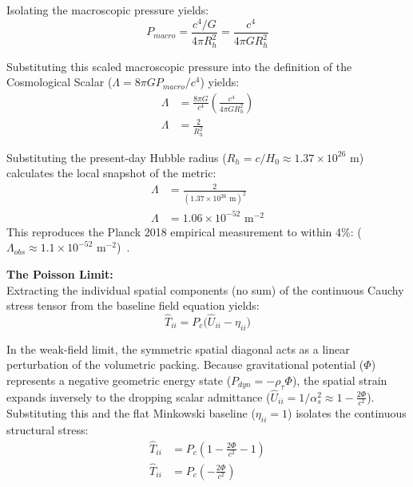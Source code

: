 Isolating the macroscopic pressure yields:
\begin{equation}
    P_{macro} = \frac{c^4/G}{4\pi R_h^2} = \frac{c^4}{4\pi G R_h^2} 
\end{equation}

Substituting this scaled macroscopic pressure into the definition of the Cosmological Scalar ($\Lambda = 8\pi G P_{macro} / c^4$) yields: 
\begin{align}
    \Lambda &= \frac{8\pi G}{c^4} \left( \frac{c^4}{4\pi G R_h^2} \right) \nonumber \\
    \Lambda &= \frac{2}{R_h^2} \label{eq:tensor_cosmological_constant}
\end{align}

Substituting the present-day Hubble radius ($R_h = c / H_0 \approx 1.37 \times 10^{26} \text{ m}$) calculates the local snapshot of the metric: 
\begin{align}
    \Lambda &= \frac{2}{(1.37 \times 10^{26} \text{ m})^2} \nonumber \\
    \Lambda &= 1.06 \times 10^{-52} \text{ m}^{-2} \label{eq:lambda_numerical}
\end{align}
This reproduces the Planck 2018 empirical measurement to within 4\%:  ($\Lambda_{obs} \approx 1.1 \times 10^{-52} \text{ m}^{-2}$)~\cite{Planck2018}. 

\vspace{0.2 cm}

\textbf{The Poisson Limit:}\\

Extracting the individual spatial components (no sum) of the continuous Cauchy stress tensor from the baseline field equation yields:
\begin{equation}
    \hat{T}_{ii} = P_c \Big( \hat{U}_{ii} - \eta_{ii} \Big)
\end{equation}

In the weak-field limit, the symmetric spatial diagonal acts as a linear perturbation of the volumetric packing. Because gravitational potential ($\Phi$) represents a negative geometric energy state ($P_{dyn} = -\rho_\tau \Phi$), the spatial strain expands inversely to the dropping scalar admittance ($\hat{U}_{ii} = 1/\alpha_s^2 \approx 1 - \frac{2\Phi}{c^2}$). 
Substituting this and the flat Minkowski baseline ($\eta_{ii} = 1$) isolates the continuous structural stress: 
\begin{align}
    \hat{T}_{ii} &= P_c \left( 1 - \frac{2\Phi}{c^2} - 1 \right) \nonumber \\ 
    \hat{T}_{ii} &= P_c \left( - \frac{2\Phi}{c^2} \right) 
\end{align}

